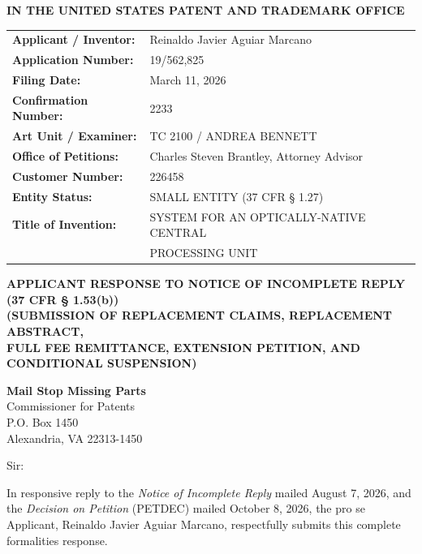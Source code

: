 \documentclass[11pt,letterpaper]{article}
\begin{document}
\thispagestyle{empty}

\begin{center}
    \textbf{\large IN THE UNITED STATES PATENT AND TRADEMARK OFFICE}
\end{center}

\vspace{0.3cm}
\noindent\begin{tabular}{p{2.3in}p{4.0in}}
\textbf{Applicant / Inventor:} & Reinaldo Javier Aguiar Marcano \\
\textbf{Application Number:} & 19/562,825 \\
\textbf{Filing Date:} & March 11, 2026 \\
\textbf{Confirmation Number:} & 2233 \\
\textbf{Art Unit / Examiner:} & TC 2100 / ANDREA BENNETT \\
\textbf{Office of Petitions:} & Charles Steven Brantley, Attorney Advisor \\
\textbf{Customer Number:} & 226458 \\
\textbf{Entity Status:} & SMALL ENTITY (37 CFR \S{} 1.27) \\
\textbf{Title of Invention:} & SYSTEM FOR AN OPTICALLY-NATIVE CENTRAL \\
& PROCESSING UNIT \\
\end{tabular}

\vspace{0.4cm}
\begin{center}
    \textbf{\large APPLICANT RESPONSE TO NOTICE OF INCOMPLETE REPLY \\
    (37 CFR \S{} 1.53(b))} \\
    \textbf{\normalsize (SUBMISSION OF REPLACEMENT CLAIMS, REPLACEMENT ABSTRACT, \\
    FULL FEE REMITTANCE, EXTENSION PETITION, AND CONDITIONAL SUSPENSION)}
\end{center}

\noindent\textbf{Mail Stop Missing Parts} \\
Commissioner for Patents \\
P.O. Box 1450 \\
Alexandria, VA 22313-1450

\vspace{0.2cm}
Sir:

In responsive reply to the \textit{Notice of Incomplete Reply} mailed August 7, 2026, and the \textit{Decision on Petition} (PETDEC) mailed October 8, 2026, the pro se Applicant, Reinaldo Javier Aguiar Marcano, respectfully submits this complete formalities response.
\end{document}

